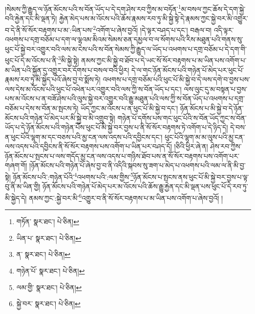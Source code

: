 །སེམས་ཀྱི་རྒྱུད་ལ་ཉོན་མོངས་པའི་ས་བོན་ཡོད་པ་དེ་དག་ཤེས་རབ་ཀྱིས་མ་བཏོན་\footnote{གཏོན་  སྣར་ཐང་།  པེ་ཅིན། }མ་བསལ་ཀྱང་ཆོས་དེ་དག་སྐྱེ་བའི་རྐྱེན་དང་མི་ལྡན་ཏེ། རྐྱེན་མེད་པས་མ་འོངས་པའི་ཆོས་རྣམས་རབ་ཏུ་མི་སྐྱེ་སྟེ་དེ་རྣམས་ཀྱང་སྐྱེ་བར་མི་འགྱུར་བ་དེ་ནི་སོ་སོར་བརྟགས་པ་མ་:ཡིན་པས་\footnote{ཡིན་པ་  སྣར་ཐང་།  པེ་ཅིན། }འགོག་པ་ཞེས་བྱའོ། །དེ་ལྟར་བཤད་པ་དང་། བརྒལ་བ། འདི་ལྟར་འཕགས་པ་དགྲ་བཅོམ་པ་དག་ལ་ལྷའམ་མིའམ་སེམས་ཅན་དམྱལ་བ་ལ་སོགས་པའི་རིས་མཐུན་པའི་གནས་སུ་ཕུང་པོ་སྐྱེ་བར་འགྱུར་བའི་ལས་མ་ངེས་པའི་ས་བོན་སེམས་ཀྱི་རྒྱུད་ལ་ཡོད་པ་འཕགས་པ་དགྲ་བཅོམ་པ་དེ་དག་གི་ཕུང་པོ་དེ་མ་འོངས་པ་ནི་\footnote{ན་  སྣར་ཐང་།  པེ་ཅིན། }མི་སྐྱེ་སྟེ། ནམས་ཀྱང་མི་སྐྱེ་བ་ཐོབ་པ་དེ་ཡང་སོ་སོར་བརྟགས་པ་མ་ཡིན་པས་འགོག་པ་མ་ཡིན་པའི་སྐྱོན་དུ་འགྱུར་བར་དོགས་པ་བསལ་བའི་ཕྱིར། དེ་ལ་གང་ཉོན་མོངས་པའི་གཉེན་པོ་མེད་པར་ཕུང་པོ་རྣམས་རབ་ཏུ་མི་སྐྱེད་པའོ་ཞེས་བྱ་བ་སྨོས་ཏེ། འཕགས་པ་དགྲ་བཅོམ་པའི་ཕུང་པོ་མི་སྐྱེ་བ་དེ་ལས་དགེ་བ་བྱས་པས་ལས་དེས་མ་འོངས་པའི་ཕུང་པོ་འཕེན་པར་འགྱུར་བའི་ལས་ཀྱི་ས་བོན་ཡོད་པ་དང་། ལས་ལུང་དུ་མ་བསྟན་པ་བྱས་པས་མ་འོངས་པ་ན་བཟོ་ཤེས་པའི་ལུས་སྐྱེ་བར་འགྱུར་བའི་རྒྱུ་མཐུན་པའི་ལས་ཀྱི་ས་བོན་ཡོད་པ་འཕགས་པ་དགྲ་བཅོམ་པ་དེས་ས་བོན་མ་སྤངས་ཏེ། ཡོད་ཀྱང་མ་འོངས་པ་ན་ཕུང་པོ་མི་སྐྱེ་བ་དང་། ཉོན་མོངས་པ་མི་སྐྱེ་བ་དེ་ཉོན་མོངས་པའི་གཉེན་པོ་མེད་པར་མི་སྐྱེ་བ་མི་འགྲུབ་སྟེ། གཉེན་པོ་དགོས་པས་གང་ཕུང་པོའི་ས་བོན་ཡོད་ཀྱང་ས་བོན་ཡོད་པ་དེ་ཉོན་མོངས་པའི་གཉེན་པོས་ཕུང་པོ་མི་སྐྱེ་བར་བྱས་པ་ནི་སོ་སོར་བརྟགས་ཏེ་འགོག་པ་དེ་ཉིད་དེ། དེ་བས་ན་ཕུང་པོའི་ལྷག་མ་དང་བཅས་པའི་མྱ་ངན་ལས་འདས་པའི་དབྱིངས་དང་། ཕུང་པོའི་ལྷག་མ་མ་ལུས་པའི་མྱ་ངན་ལས་འདས་པའི་དབྱིངས་ནི་སོ་སོར་བརྟགས་པས་འགོག་པ་ཡིན་པར་བཤད་དོ། །ཅིའི་ཕྱིར་ཞེ་ན། ཤེས་རབ་ཀྱིས་ཉོན་མོངས་པ་སྤངས་པ་ལས་གདོད་མྱ་ངན་ལས་འདས་པ་གཉིས་ཐོབ་པས་ན་སོ་སོར་བརྟགས་པས་འགོག་པར་གཞག་གོ། །ཉོན་མོངས་པའི་གཉེན་པོ་ཞེས་བྱ་བ་ནི་འདིའི་སྐབས་སུ་ཟག་པ་མེད་པ་འཕགས་པའི་ལམ་ལ་ནི་མི་བྱ་སྟེ། ཉོན་མོངས་པའི་:གཉེན་པོའི་\footnote{གཉེན་པོ་  སྣར་ཐང་།  པེ་ཅིན། }འཕགས་པའི་:ལམ་གྱིས་\footnote{ལམ་གྱི་  སྣར་ཐང་།  པེ་ཅིན། }ཉོན་མོངས་པ་སྤངས་ནས་ཕུང་པོ་མི་སྐྱེ་བར་བྱས་པ་ལྟ་བུ་ནི་མ་ཡིན་གྱི། ཉོན་མོངས་པའི་གཉེན་པོ་མེད་པར་མ་འོངས་པའི་ཆོས་རྒྱུ་རྐྱེན་དང་མི་ལྡན་པས་ཕུང་པོ་དེ་རབ་ཏུ་མི་སྐྱེད་དེ། ནམས་ཀྱང་:སྐྱེ་བར་མི་\footnote{སྐྱེ་བར་  སྣར་ཐང་།  པེ་ཅིན། }འགྱུར་བ་ནི་སོ་སོར་བརྟགས་པ་མ་ཡིན་པས་འགོག་པ་ཞེས་བྱའོ། །
